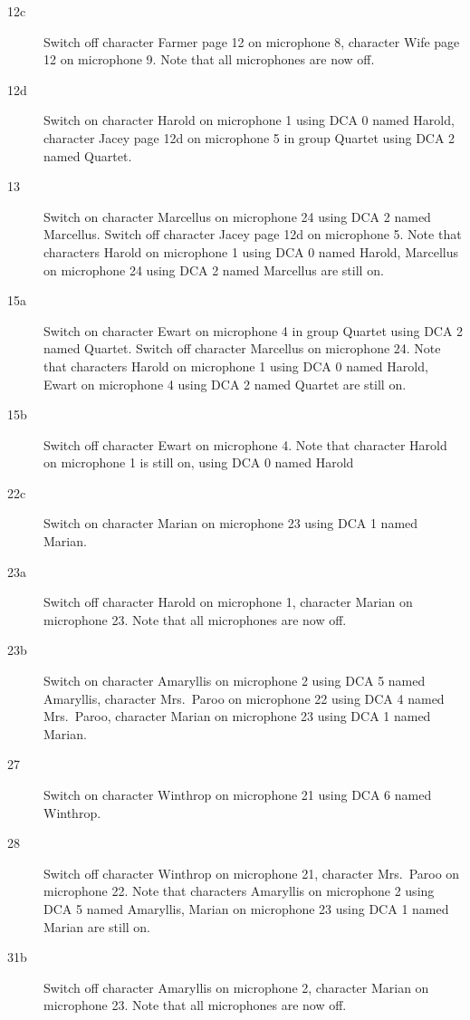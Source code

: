 \begin{description}
\item[12c]
Switch off character Farmer page 12 on microphone 8, character Wife page 12 on microphone 9. Note that all microphones are now off.

\item[12d]
Switch on character Harold on microphone 1 using DCA 0 named Harold, character Jacey page 12d on microphone 5 in group Quartet using DCA 2 named Quartet. 

\item[13]
Switch on character Marcellus on microphone 24 using DCA 2 named Marcellus. Switch off character Jacey page 12d on microphone 5. Note that characters Harold on microphone 1 using DCA 0 named Harold, Marcellus on microphone 24 using DCA 2 named Marcellus are still on.  

\item[15a]
Switch on character Ewart on microphone 4 in group Quartet using DCA 2 named Quartet. Switch off character Marcellus on microphone 24. Note that characters Harold on microphone 1 using DCA 0 named Harold, Ewart on microphone 4 using DCA 2 named Quartet are still on.  

\item[15b]
Switch off character Ewart on microphone 4. Note that character Harold on microphone 1 is still on, using DCA 0 named Harold

\item[22c]
Switch on character Marian on microphone 23 using DCA 1 named Marian. 

\item[23a]
Switch off character Harold on microphone 1, character Marian on microphone 23. Note that all microphones are now off.

\item[23b]
Switch on character Amaryllis on microphone 2 using DCA 5 named Amaryllis, character Mrs.~Paroo on microphone 22 using DCA 4 named Mrs.~Paroo, character Marian on microphone 23 using DCA 1 named Marian. 

\item[27]
Switch on character Winthrop on microphone 21 using DCA 6 named Winthrop. 

\item[28]
Switch off character Winthrop on microphone 21, character Mrs.~Paroo on microphone 22. Note that characters Amaryllis on microphone 2 using DCA 5 named Amaryllis, Marian on microphone 23 using DCA 1 named Marian are still on.  

\item[31b]
Switch off character Amaryllis on microphone 2, character Marian on microphone 23. Note that all microphones are now off.


\end{description}
